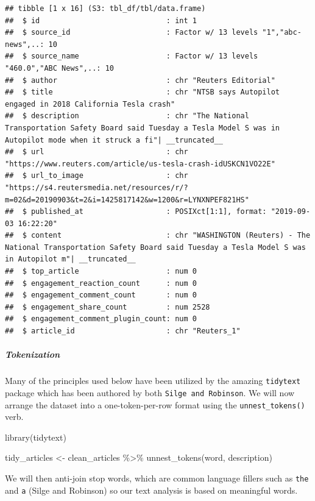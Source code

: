 \documentclass[
]{article}
\newenvironment{Shaded}{\begin{snugshade}}{\end{snugshade}}
\newcommand{\FunctionTok}[1]{\textcolor[rgb]{0.00,0.00,0.00}{#1}}
\newcommand{\NormalTok}[1]{#1}
\newcommand{\OtherTok}[1]{\textcolor[rgb]{0.56,0.35,0.01}{#1}}
\newcommand{\SpecialCharTok}[1]{\textcolor[rgb]{0.00,0.00,0.00}{#1}}
\begin{document}
\begin{verbatim}
## tibble [1 x 16] (S3: tbl_df/tbl/data.frame)
##  $ id                             : int 1
##  $ source_id                      : Factor w/ 13 levels "1","abc-news",..: 10
##  $ source_name                    : Factor w/ 13 levels "460.0","ABC News",..: 10
##  $ author                         : chr "Reuters Editorial"
##  $ title                          : chr "NTSB says Autopilot engaged in 2018 California Tesla crash"
##  $ description                    : chr "The National Transportation Safety Board said Tuesday a Tesla Model S was in Autopilot mode when it struck a fi"| __truncated__
##  $ url                            : chr "https://www.reuters.com/article/us-tesla-crash-idUSKCN1VO22E"
##  $ url_to_image                   : chr "https://s4.reutersmedia.net/resources/r/?m=02&d=20190903&t=2&i=1425817142&w=1200&r=LYNXNPEF821HS"
##  $ published_at                   : POSIXct[1:1], format: "2019-09-03 16:22:20"
##  $ content                        : chr "WASHINGTON (Reuters) - The National Transportation Safety Board said Tuesday a Tesla Model S was in Autopilot m"| __truncated__
##  $ top_article                    : num 0
##  $ engagement_reaction_count      : num 0
##  $ engagement_comment_count       : num 0
##  $ engagement_share_count         : num 2528
##  $ engagement_comment_plugin_count: num 0
##  $ article_id                     : chr "Reuters_1"
\end{verbatim}

\hypertarget{tokenization}{%
\subparagraph{\texorpdfstring{\textbf{Tokenization}}{Tokenization}}\label{tokenization}}

Many of the principles used below have been utilized by the amazing
\texttt{tidytext} package which has been authored by both
\texttt{Silge\ and\ Robinson}. We will now arrange the dataset into a
one-token-per-row format using the \texttt{unnest\_tokens()} verb.

\begin{Shaded}
\begin{Highlighting}[]
\FunctionTok{library}\NormalTok{(tidytext)}

\NormalTok{tidy\_articles }\OtherTok{\textless{}{-}}\NormalTok{ clean\_articles }\SpecialCharTok{\%\textgreater{}\%}
                 \FunctionTok{unnest\_tokens}\NormalTok{(word, description) }
\end{Highlighting}
\end{Shaded}

We will then anti-join stop words, which are common language fillers
such as \texttt{the} and \texttt{a} (Silge and Robinson) so our text
analysis is based on meaningful words.
\end{document}
